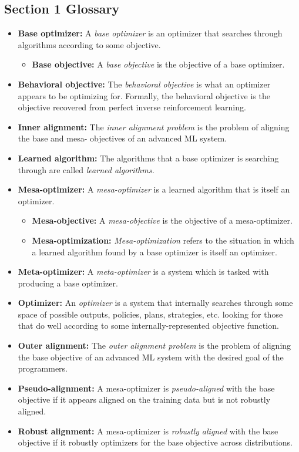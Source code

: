 \documentclass[
  onecolumn,
  natbib,
]{miri-tech-article}
\begin{document}
\subsection{Section 1 Glossary}
\begin{itemize}
\item \textbf{Base optimizer:} A \textit{base optimizer} is an optimizer that searches through algorithms according to some objective.
  \begin{itemize}
  \item \textbf{Base objective:} A \textit{base objective} is the objective of a base optimizer.
  \end{itemize}
\item \textbf{Behavioral objective:} The \textit{behavioral objective} is what an optimizer appears to be optimizing for. Formally, the behavioral objective is the objective recovered from perfect inverse reinforcement learning.
\item \textbf{Inner alignment:} The \textit{inner alignment problem} is the problem of aligning the base and mesa- objectives of an advanced ML system.
\item \textbf{Learned algorithm:} The algorithms that a base optimizer is searching through are called \textit{learned algorithms.}
\item \textbf{Mesa-optimizer:} A \textit{mesa-optimizer} is a learned algorithm that is itself an optimizer.
  \begin{itemize}
  \item \textbf{Mesa-objective:} A \textit{mesa-objective} is the objective of a mesa-optimizer.
  \item \textbf{Mesa-optimization:} \textit{Mesa-optimization} refers to the situation in which a learned algorithm found by a base optimizer is itself an optimizer.
  \end{itemize}
\item \textbf{Meta-optimizer:} A \textit{meta-optimizer} is a system which is tasked with producing a base optimizer.
\item \textbf{Optimizer:} An \textit{optimizer} is a system that internally searches through some space of possible outputs, policies, plans, strategies, etc. looking for those that do well according to some internally-represented objective function.
\item \textbf{Outer alignment:} The \textit{outer alignment problem} is the problem of aligning the base objective of an advanced ML system with the desired goal of the programmers.
\item \textbf{Pseudo-alignment:} A mesa-optimizer is \textit{pseudo-aligned} with the base objective if it appears aligned on the training data but is not robustly aligned.
\item \textbf{Robust alignment:} A mesa-optimizer is \textit{robustly aligned} with the base objective if it robustly optimizers for the base objective across distributions.
\end{itemize}
\end{document}
